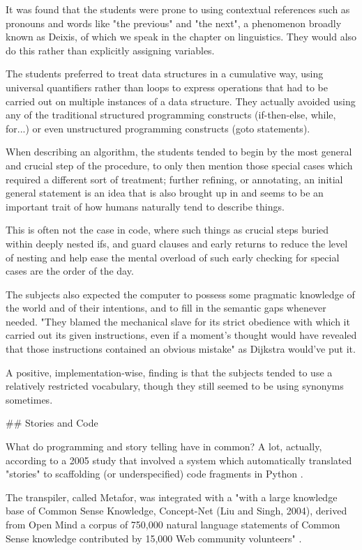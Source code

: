 It was found that the students were prone to using contextual references such as pronouns and words like "the previous" and "the next", a phenomenon broadly known as Deixis, of which we speak in the chapter on linguistics. They would also do this rather than explicitly assigning variables.

The students preferred to treat data structures in a cumulative way, using universal quantifiers rather than loops to express operations that had to be carried out on multiple instances of a data structure. They actually avoided using any of the traditional structured programming constructs (if-then-else, while, for...) or even unstructured programming constructs (goto statements).

When describing an algorithm, the students tended to begin by the most general and crucial step of the procedure, to only then mention those special cases which required a different sort of treatment; further refining, or annotating, an initial general statement is an idea that is also brought up in \cite{brachman2022machines} and seems to be an important trait of how humans naturally tend to describe things.

This is often not the case in code, where such things as crucial steps buried within deeply nested ifs, and guard clauses and early returns to reduce the level of nesting and help ease the mental overload of such early checking for special cases are the order of the day.

The subjects also expected the computer to possess some pragmatic knowledge of the world and of their intentions, and to fill in the semantic gaps whenever needed. "They blamed the mechanical slave for its strict obedience with which it carried out its given instructions, even if a moment's thought would have revealed that those instructions contained an obvious mistake" \cite{foolishnessnatprogramming} as Dijkstra would've put it.

A positive, implementation-wise, finding is that the subjects tended to use a relatively restricted vocabulary, though they still seemed to be using synonyms sometimes.

## Stories and Code

What do programming and story telling have in common? A lot, actually, according to a 2005 study that involved a system which automatically translated "stories" to scaffolding (or underspecified) code fragments in Python \cite{liu2005metafor, liu2005programmatic}.

The transpiler, called Metafor, was integrated with a "with a large knowledge base of Common Sense Knowledge, Concept-Net (Liu and Singh, 2004), derived from Open Mind a corpus of 750,000 natural language statements of Common Sense knowledge contributed by 15,000 Web community volunteers" \cite{liu2005metafor}.

